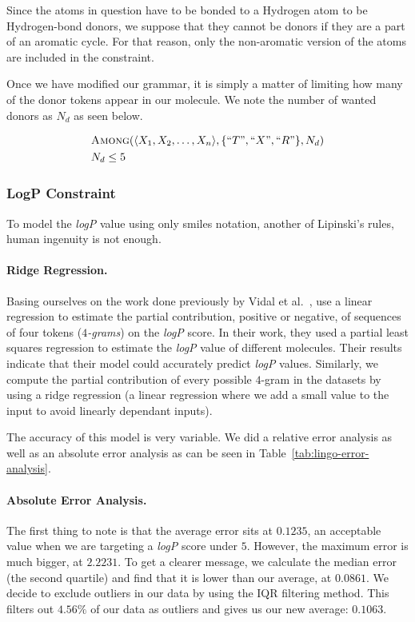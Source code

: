 \documentclass[../Document.tex]{subfiles}
\begin{document}
Since the atoms in question have to be bonded to a Hydrogen atom to be Hydrogen-bond donors, we suppose that they cannot be donors if they are a part of an aromatic cycle. For that reason, only the non-aromatic version of the atoms are included in the constraint.

Once we have modified our grammar, it is simply a matter of limiting how many of the donor tokens appear in our molecule. We note the number of wanted donors as $N_d$ as seen below.

\begin{align*}
    &\mbox{\sc Among}(\langle X_1, X_2, \ldots, X_n \rangle, \{``T",``X",``R"\}, N_d)\\
    &N_d \leq 5
\end{align*}


\subsubsection{LogP Constraint}
To model the \emph{logP} value using only \gls{smiles} notation, another of Lipinski's rules, human ingenuity is not enough.

\paragraph{Ridge Regression.}
Basing ourselves on the work done previously by Vidal et al.~\cite{lingos}, use a linear regression to estimate the partial contribution, positive or negative, of sequences of four tokens (\emph{$4$-grams}) on the \emph{logP} score.
In their work, they used a partial least squares regression to estimate the \emph{logP} value of different molecules.
Their results indicate that their model could accurately predict \emph{logP} values.
Similarly, we compute the partial contribution of every possible $4$-gram in the datasets by using a ridge regression (a linear regression where we add a small value to the input to avoid linearly dependant inputs).

The accuracy of this model is very variable. We did a relative error analysis as well as an absolute error analysis as can be seen in Table~\ref{tab:lingo-error-analysis}.

\paragraph{Absolute Error Analysis.} The first thing to note is that the average error sits at $0.1235$, an acceptable value when we are targeting a \emph{logP} score under $5$. However, the maximum error is much bigger, at $2.2231$. To get a clearer message, we calculate the median error (\ie the second quartile) and find that it is lower than our average, at $0.0861$. We decide to exclude outliers in our data by using the IQR filtering method. This filters out $4.56\%$ of our data as outliers and gives us our new average: $0.1063$.
\end{document}
